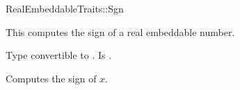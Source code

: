 \begin{ccRefFunctionObjectConcept}{RealEmbeddableTraits::Sgn}

\ccDefinition

This  computes the sign of a real embeddable number. 
 
\ccRefines 


\ccTypes
{} 
        { Type convertible to .}
        { Is .}

\ccOperations
{}

        { Computes the sign of $x$. }


\ccSeeAlso

\\

\end{ccRefFunctionObjectConcept} 
